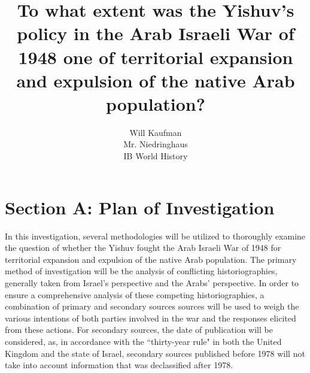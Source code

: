 \documentclass[12pt]{turabian-researchpaper}
\begin{document}
\title{To what extent was the Yishuv's policy in the Arab Israeli War of 1948 one of territorial expansion and expulsion of the native Arab population?}



\author{Will Kaufman \\ Mr. Niedringhaus \\ IB World History}
\maketitle



\section{Section A: Plan of Investigation}
In this investigation, several methodologies will be utilized to thoroughly examine the question of whether the Yishuv fought the Arab Israeli War of 1948 for territorial expansion and expulsion of the native Arab population.  The primary method of investigation will be the analysis of conflicting historiographies, generally taken from Israel's perspective and the Arabs' perspective.  In order to ensure a comprehensive analysis of these competing historiographies, a combination of primary and secondary sources sources will be used to weigh the various intentions of both parties involved in the war and the responses elicited from these actions.  For secondary sources, the date of publication will be considered, as, in accordance with the ``thirty-year rule" in both the United Kingdom and the state of Israel, secondary sources published before 1978 will not take into account information that was declassified after 1978.

\end{document}

